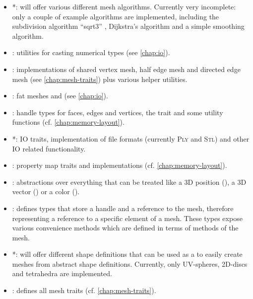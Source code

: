 \begin{itemize}
  \item \textbf{}*: will offer various different mesh algorithms.
  Currently very incomplete: only a couple of example algorithms are implemented, including the subdivision algorithm \enquote{sqrt3} \cite{kobbelt20003}, Dijkstra's algorithm \cite{dijkstra1959note} and a simple smoothing algorithm.
  \item \textbf{}: utilities for casting numerical types (see \autoref{chap:io}).
  \item \textbf{}: implementations of shared vertex mesh, half edge mesh and directed edge mesh (see \autoref{chap:mesh-traits}) plus various helper utilities.
  \item \textbf{}: fat meshes  and  (see \autoref{chap:io}).
  \item \textbf{}: handle types for faces, edges and vertices, the  trait and some utility functions (cf. \autoref{chap:memory-layout}).
  \item \textbf{}*: IO traits, implementation of file formats (currently \textsc{Ply} and \textsc{Stl}) and other IO related functionality.
  \item \textbf{}: property map traits and implementations (cf. \autoref{chap:memory-layout}).
  \item \textbf{}: abstractions over everything that can be treated like a 3D position (), a 3D vector () or a color ().
  \item \textbf{}: defines types that store a handle and a reference to the mesh, therefore representing a reference to a specific element of a mesh.
  These types expose various convenience methods which are defined in terms of methods of the mesh.
  \item \textbf{}*: will offer different shape definitions that can be used as a  to easily create meshes from abstract shape definitions.
  Currently, only UV-spheres, 2D-discs and tetrahedra are implemented.
  \item \textbf{}: defines all mesh traits (cf. \autoref{chap:mesh-traits}).
\end{itemize}
